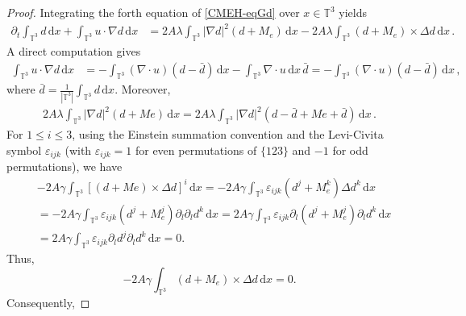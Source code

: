 \documentclass[reqno,11pt]{amsart}
\numberwithin{equation}{section}
\def\d{\mathrm{d}}
\begin{document}
\begin{proof}

Integrating the forth equation of \eqref{CMEH-eqGd} over $x\in \mathbb{T}^3$ yields
\begin{equation*}
\begin{aligned}
\partial_t \int_{\mathbb{T}^3} d \, \d x + \int_{\mathbb{T}^3} u \cdot \nabla d \, \d x & = 2A \lambda \int_{\mathbb{T}^3} |\nabla d|^2 (d +M_e) \, \d x - 2A \lambda \int_{\mathbb{T}^3} (d +M_e) \times \Delta d \, \d x \,.
\end{aligned}
\end{equation*}
A direct computation gives
\begin{equation*}
\begin{aligned}
\int_{\mathbb{T}^3} u \cdot \nabla d \, \d x & = -\int_{\mathbb{T}^3} (\nabla \cdot u) (d - \bar{d}) \, \d x - \int_{\mathbb{T}^3} \nabla \cdot u \, \d x \, \bar{d} = - \int_{\mathbb{T}^3} (\nabla \cdot u) ( d - \bar{d} ) \, \d x \,,
\end{aligned}
\end{equation*}
where $\bar{d} = \frac{1}{|\mathbb{T}^3|} \int_{\mathbb{T}^3} d \, \d x$. Moreover,
\begin{equation*}
\begin{aligned}
2A\lambda \int_{\mathbb{T}^3} |\nabla d|^2 (d+Me)\,\d x = 2A\lambda \int_{\mathbb{T}^3} |\nabla d|^2 (d-\bar{d}+ Me+\bar{d})\, \d x \,.
\end{aligned}
\end{equation*}
For $1 \leq i \leq 3$, using the Einstein summation convention and the Levi-Civita symbol $\varepsilon_{ijk}$ (with $\varepsilon_{ijk}=1$ for even permutations of $\{123\}$ and $-1$ for odd permutations), we have
\begin{equation*}
\begin{aligned}
 & -2A\gamma \int_{\mathbb{T}^3} [(d+Me)\times \Delta d]^i\, \d x
 = -2A \gamma  \int_{\mathbb{T}^3} \varepsilon_{ijk} (d^j +M_e^k) \Delta d^k\, \d x \\
 & = -2A\gamma \int_{\mathbb{T}^3} \varepsilon_{ijk} (d^j +M_e^j) \partial_l \partial_l d^k\, \d x = 2A \gamma  \int_{\mathbb{T}^3}\varepsilon_{ijk} \partial_l (d^j +M_e^j) \partial_l d^k\, \d x \\
 & = 2A \gamma \int_{\mathbb{T}^3} \varepsilon_{ijk} \partial_l d^j \partial_l d^k\, \d x = 0.
\end{aligned}
\end{equation*}
Thus,
$$ -2A\gamma  \int_{\mathbb{T}^3} (d+M_e) \times \Delta d\, \d x = 0.$$
Consequently,

\end{proof}
\end{document}
